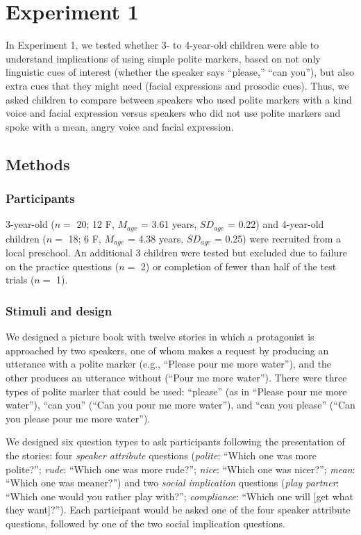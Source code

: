 \documentclass[10pt, letterpaper]{article}
\begin{document}
\section{Experiment 1}\label{experiment-1}

In Experiment 1, we tested whether 3- to 4-year-old children were able
to understand implications of using simple polite markers, based on not
only linguistic cues of interest (whether the speaker says ``please,''
``can you''), but also extra cues that they might need (facial
expressions and prosodic cues). Thus, we asked children to compare
between speakers who used polite markers with a kind voice and facial
expression versus speakers who did not use polite markers and spoke with
a mean, angry voice and facial expression.

\subsection{Methods}\label{methods}

\subsubsection{Participants}\label{participants}

3-year-old (\(n=\) 20; 12 F, \(M_{age}\) = 3.61 years, \(SD_{age}\) =
0.22) and 4-year-old children (\(n=\) 18; 6 F, \(M_{age}\) = 4.38 years,
\(SD_{age}\) = 0.25) were recruited from a local preschool. An
additional 3 children were tested but excluded due to failure on the
practice questions (\(n=\) 2) or completion of fewer than half of the
test trials (\(n=\) 1).

\subsubsection{Stimuli and design}\label{stimuli-and-design}

We designed a picture book with twelve stories in which a protagonist is
approached by two speakers, one of whom makes a request by producing an
utterance with a polite marker (e.g., ``Please pour me more water''),
and the other produces an utterance without (``Pour me more water'').
There were three types of polite marker that could be used: ``please''
(as in ``Please pour me more water''), ``can you'' (``Can you pour me
more water''), and ``can you please'' (``Can you please pour me more
water'').

We designed six question types to ask participants following the
presentation of the stories: four \emph{speaker attribute} questions
(\emph{polite}: ``Which one was more polite?''; \emph{rude}: ``Which one
was more rude?''; \emph{nice}: ``Which one was nicer?''; \emph{mean}:
``Which one was meaner?'') and two \emph{social implication} questions
(\emph{play partner}: ``Which one would you rather play with?'';
\emph{compliance}: ``Which one will {[}get what they want{]}?''). Each
participant would be asked one of the four speaker attribute questions,
followed by one of the two social implication questions.
\end{document}
